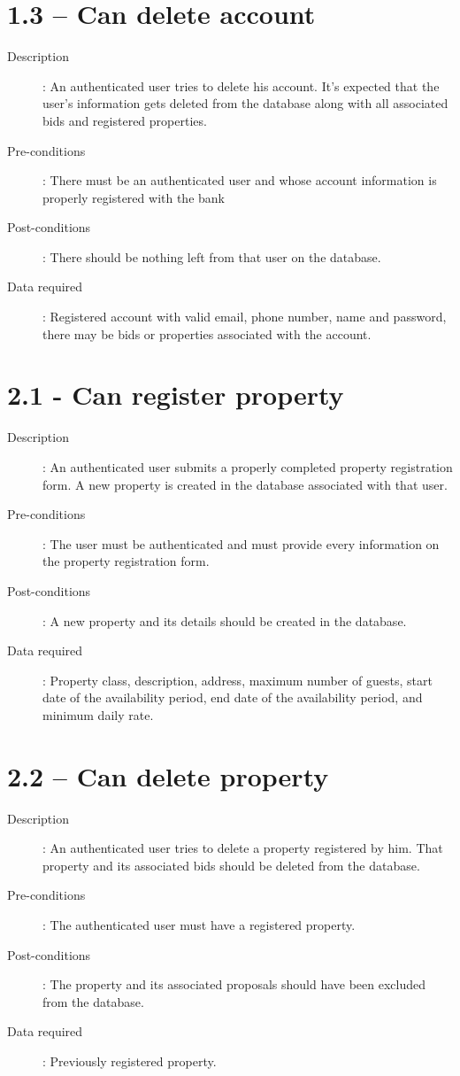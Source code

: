 \section*{1.3 – Can delete account}
\begin{description}

    \item[Description]: An authenticated user tries to delete his account. It’s expected that the user’s information gets deleted from the database along with all associated bids and registered properties.
    \item[Pre-conditions]: There must be an authenticated user and whose account information is properly registered with the bank
    \item[Post-conditions]: There should be nothing left from that user on the database.
    \item[Data required]: Registered account with valid email, phone number, name and password, there may be bids or properties associated with the account.
\end{description}

\section*{2.1 - Can register property}
\begin{description}
    \item[Description]: An authenticated user submits a properly completed property registration form. A new property is created in the database associated with that user.
    \item[Pre-conditions]: The user must be authenticated and must provide every information on the property registration form.
    \item[Post-conditions]: A new property and its details should be created in the database.
    \item[Data required]: Property class, description, address, maximum number of guests, start date of the availability period, end date of the availability period, and minimum daily rate.
\end{description}

\section*{2.2 – Can delete property}
\begin{description}
    \item[Description]: An authenticated user tries to delete a property registered by him. That property and its associated bids should be deleted from the database.
    \item[Pre-conditions]: The authenticated user must have a registered property.
    \item[Post-conditions]: The property and its associated proposals should have been excluded from the database.
    \item[Data required]: Previously registered property.
\end{description}

